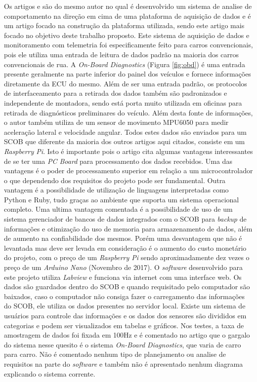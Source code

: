 Os artigos \cite{designAndImplementation2015} e \cite{developmentOfAn2016} são do mesmo autor no qual \cite{developmentOfAn2016} é desenvolvido um sistema de analise de comportamento na direção em cima de uma plataforma de aquisição de dados e \cite{designAndImplementation2015} é um artigo focado na construção da plataforma utilizada, sendo este artigo mais focado no objetivo deste trabalho proposto. Este sistema de aquisição de dados e monitoramento com telemetria foi especificamente feito para carros convencionais, pois ele utiliza uma entrada de leitura de dados padrão na maioria dos carros convencionais de rua. A \textit{On-Board Diagnostics} (Figura \ref{fig:obd}) é uma entrada presente geralmente na parte inferior do painel dos veículos e fornece informações diretamente da ECU do mesmo. Além de ser uma entrada padrão, os protocolos de interfaceamento para a retirada dos dados também são padronizados e independente de montadora, sendo está porta muito utilizada em oficinas para retirada de diagnósticos preliminares do veículo. Além desta fonte de informações, o autor também utiliza de um sensor de movimento MPU6050 para medir aceleração lateral e velocidade angular. Todos estes dados são enviados para um SCOB que diferente da maioria dos outros artigos aqui citados, consiste em um \textit{Raspberry Pi}. Isto é importante pois o artigo cita algumas vantagens interessantes de se ter uma \textit{PC Board} para processamento dos dados recebidos. Uma das vantagens é o poder de processamento superior em relação a um microcontrolador o que dependendo dos requisitos do projeto pode ser fundamental. Outra vantagem é a possibilidade de utilização de linguagens interpretadas como Python e Ruby, tudo graças ao ambiente que suporta um sistema operacional completo. Uma ultima vantagem comentada é a possibilidade de uso de um sistema gerenciador de bancos de dados integrados com o SCOB para \textit{backup} de informações e otimização do uso de memoria para armazenamento de dados, além de aumento na confiabilidade dos mesmos. Porém uma desvantagem que não é levantada mas deve ser levada em consideração é o aumento do custo monetário do projeto, com o preço de um \textit{Raspberry Pi} sendo aproximadamente dez vezes o preço de um \textit{Arduino Nano} (Novembro de 2017). O \textit{software} desenvolvido para este projeto utiliza \textit{Labview} e funciona via internet com uma interface web. Os dados são guardados dentro do SCOB e quando requisitado pelo computador são baixados, caso o computador não consiga fazer o carregamento das informações do SCOB, ele utiliza os dados presentes no servidor local. Existe um sistema de usuários para controle das informações e os dados dos sensores são divididos em categorias e podem ser visualizados em tabelas e gráficos. Nos testes, a taxa de amostragem de dados foi fixada em 100Hz e é comentado no artigo que o gargalo do sistema nesse quesito é o sistema \textit{On-Board Diagnostics}, que varia de carro para carro. Não é comentado nenhum tipo de planejamento ou analise de requisitos na parte do \textit{software} e também não é apresentado nenhum diagrama explicando o sistema corrente.    

